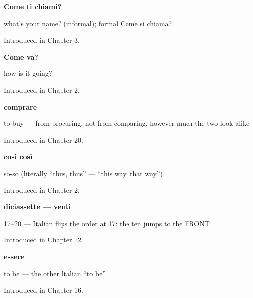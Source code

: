 \noindent\begin{minipage}[t]{\linewidth}
\raggedright
\textbf{Come ti chiami?}\par
\small what's your name? (informal); formal Come si chiama?\par
\footnotesize Introduced in Chapter 3.
\end{minipage}\par\medskip

\noindent\begin{minipage}[t]{\linewidth}
\raggedright
\textbf{Come va?}\par
\small how is it going?\par
\footnotesize Introduced in Chapter 2.
\end{minipage}\par\medskip

\noindent\begin{minipage}[t]{\linewidth}
\raggedright
\textbf{comprare}\par
\small to buy — from procuring, not from comparing, however much the two look alike\par
\footnotesize Introduced in Chapter 20.
\end{minipage}\par\medskip

\noindent\begin{minipage}[t]{\linewidth}
\raggedright
\textbf{così così}\par
\small so-so (literally \textquotedblleft{}thus, thus\textquotedblright{} — \textquotedblleft{}this way, that way\textquotedblright{})\par
\footnotesize Introduced in Chapter 2.
\end{minipage}\par\medskip

\noindent\begin{minipage}[t]{\linewidth}
\raggedright
\textbf{diciassette — venti}\par
\small 17–20 — Italian flips the order at 17: the ten jumps to the FRONT\par
\footnotesize Introduced in Chapter 12.
\end{minipage}\par\medskip

\noindent\begin{minipage}[t]{\linewidth}
\raggedright
\textbf{essere}\par
\small to be — the other Italian “to be”\par
\footnotesize Introduced in Chapter 16.
\end{minipage}\par\medskip

